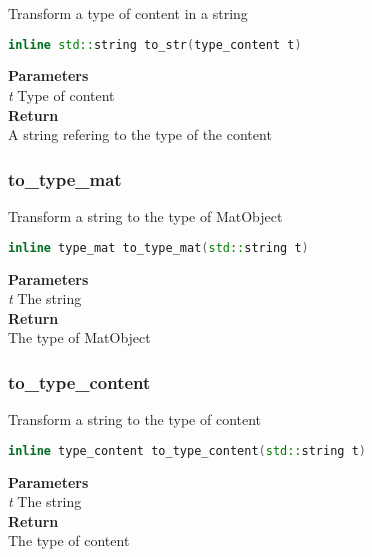 \begin{mdframed}
Transform a type of content in a string
\begin{lstlisting}[language=C++]
inline std::string to_str(type_content t) 
\end{lstlisting}
\textbf{Parameters} \\ 
\textit{t} Type of content \\ 
\textbf{Return} \\ 
A string refering to the type of the content\\ 
\end{mdframed}

\subsubsection{to\_type\_mat}
\begin{mdframed}
Transform a string to the type of MatObject
\begin{lstlisting}[language=C++]
inline type_mat to_type_mat(std::string t) 
\end{lstlisting}
\textbf{Parameters} \\ 
\textit{t} The string \\ 
\textbf{Return} \\ 
The type of MatObject\\ 
\end{mdframed}

\subsubsection{to\_type\_content}
\begin{mdframed}
Transform a string to the type of content
\begin{lstlisting}[language=C++]
inline type_content to_type_content(std::string t) 
\end{lstlisting}
\textbf{Parameters} \\ 
\textit{t} The string \\ 
\textbf{Return} \\ 
The type of content\\ 
\end{mdframed}

